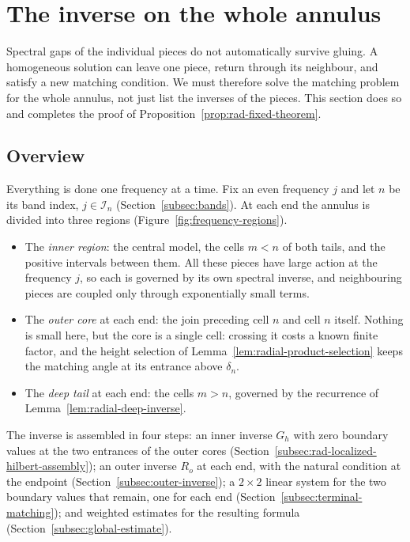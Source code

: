 \section{The inverse on the whole annulus}
\label{sec:radial-reference-inverse}

Spectral gaps of the individual pieces do not automatically survive
gluing. A homogeneous solution can leave one piece, return through its
neighbour, and satisfy a new matching condition. We must therefore
solve the matching problem for the whole annulus, not just list the
inverses of the pieces. This section does so and completes the proof
of Proposition~\ref{prop:rad-fixed-theorem}.

\subsection{Overview}

Everything is done one frequency at a time. Fix an even frequency $j$
and let $n$ be its band index, $j\in\mathcal I_n$
(Section~\ref{subsec:bands}). At each end the annulus is divided into
three regions (Figure~\ref{fig:frequency-regions}).
\begin{itemize}
\item The \emph{inner region}: the central model, the cells $m<n$ of
 both tails, and the positive intervals between them. All these
 pieces have large action at the frequency $j$, so each is governed by
 its own spectral inverse, and neighbouring pieces are coupled only
 through exponentially small terms.
\item The \emph{outer core} at each end: the join preceding cell $n$
 and cell $n$ itself. Nothing is small here, but the core is a single
 cell: crossing it costs a known finite factor, and the height
 selection of Lemma~\ref{lem:radial-product-selection} keeps the
 matching angle at its entrance above $\delta_n$.
\item The \emph{deep tail} at each end: the cells $m>n$, governed by
 the recurrence of Lemma~\ref{lem:radial-deep-inverse}.
\end{itemize}
The inverse is assembled in four steps: an inner inverse $G_h$ with
zero boundary values at the two entrances of the outer cores
(Section~\ref{subsec:rad-localized-hilbert-assembly}); an outer inverse
$R_o$ at each end, with the natural condition at the endpoint
(Section~\ref{subsec:outer-inverse}); a $2\times2$ linear system for
the two boundary values that remain, one for each end
(Section~\ref{subsec:terminal-matching}); and weighted estimates for
the resulting formula (Section~\ref{subsec:global-estimate}).

